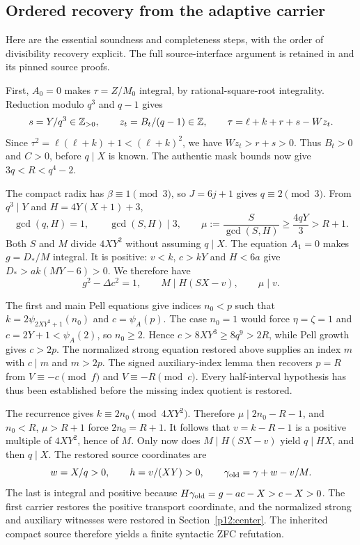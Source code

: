 \subsection{Ordered recovery from the adaptive carrier}
\label{p12:adaptive}

Here are the essential soundness and completeness steps, with the order
of divisibility recovery explicit. The full source-interface argument is
retained in  and its pinned source proofs.

First, $A_0=0$ makes $\tau=Z/M_0$ integral, by rational-square-root
integrality. Reduction modulo $q^3$ and $q-1$ gives
\[
 s=Y/q^3\in\mathbb Z_{>0},\qquad z_t=B_t/(q-1)\in\mathbb Z,
 \qquad \tau=\ell+k+r+s-Wz_t.
\]
Since $\tau^2=\ell(\ell+k)+1< (\ell+k)^2$, we have $Wz_t>r+s>0$.
Thus $B_t>0$ and $C>0$, before $q\mid X$ is known. The authentic mask
bounds now give $3q<R<q^4-2$.

The compact radix has $\beta\equiv1\pmod3$, so $J=6j+1$ gives
$q\equiv2\pmod3$. From $q^3\mid Y$ and $H=4Y(X+1)+3$,
\[
 \gcd(q,H)=1,\qquad \gcd(S,H)\mid3,
 \qquad \mu:=\frac{S}{\gcd(S,H)}\ge\frac{4qY}{3}>R+1.
\]
Both $S$ and $M$ divide $4XY^2$ without assuming $q\mid X$.
The equation $A_1=0$ makes $g=D_*/M$ integral. It is positive: $v<k$,
$c>kY$ and $H<6a$ give $D_*>ak(MY-6)>0$. We therefore have
\[
 g^2-\Delta c^2=1,\qquad M\mid H(SX-v),\qquad \mu\mid v.
\]

The first and main Pell equations give indices $n_0<p$ such that
$k=2\psi_{2XY^2+1}(n_0)$ and $c=\psi_A(p)$.
The case $n_0=1$ would force $\eta=\zeta=1$ and
$c=2Y+1<\psi_A(2)$, so $n_0\ge2$. Hence
$c>8XY^3\ge8q^9>2R$, while Pell growth gives $c>2p$.
The normalized strong equation restored above supplies an index $m$ with
$c\mid m$ and $m>2p$. The signed auxiliary-index lemma then recovers
$p=R$ from $V\equiv-c\pmod f$ and $V\equiv-R\pmod c$.
Every half-interval hypothesis has thus been established before the
missing index quotient is restored.

The recurrence gives $k\equiv2n_0\pmod{4XY^2}$. Therefore
$\mu\mid2n_0-R-1$, and $n_0<R$, $\mu>R+1$ force $2n_0=R+1$.
It follows that $v=k-R-1$ is a positive multiple of $4XY^2$, hence of $M$.
Only now does $M\mid H(SX-v)$ yield $q\mid HX$, and then $q\mid X$.
The restored source coordinates are
\[
 w=X/q>0,\qquad h=v/(XY)>0,\qquad
 \gamma_{\rm old}=\gamma+w-v/M.
\]
The last is integral and positive because
$H\gamma_{\rm old}=g-ac-X>c-X>0$. The first carrier restores the positive
transport coordinate, and the normalized strong and auxiliary witnesses
were restored in Section~\ref{p12:center}. The inherited compact source
therefore yields a finite syntactic ZFC refutation.

